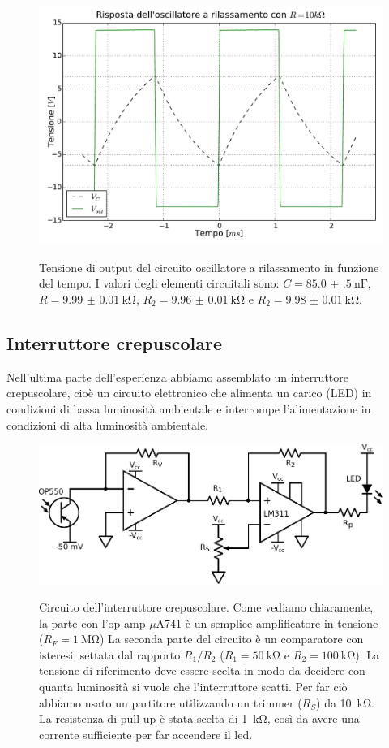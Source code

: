 \begin{figure}[ht]
 \centering
   {\includegraphics[width=14.5cm]{../E04/latex/osc10k.pdf}}
 \caption{Tensione di output del circuito oscillatore a rilassamento in funzione del tempo. I valori degli elementi circuitali sono: $C=\SI{85.0(5)}{\nano\farad}$, $R=\SI{9.99(1)}{\kohm}$, $R_2= \SI{9.96(1)}{\kohm}$ e $R_2=\SI{9.98(1)}{\kohm}$.}
 \label{gr4:osc10k}
\end{figure}

\subsection{Interruttore crepuscolare}

Nell'ultima parte dell'esperienza abbiamo assemblato un interruttore crepuscolare, cioè un circuito elettronico che alimenta un carico (LED) in condizioni di bassa luminosità ambientale e interrompe l'alimentazione in condizioni di alta luminosità ambientale.

\begin{figure}[ht]
 \centering
   {\includegraphics[width=12.5cm]{../E04/latex/c_crepuscolare.pdf}}
 \caption{Circuito dell'interruttore crepuscolare. Come vediamo chiaramente, la parte con l'op-amp $\mu$A741 è un semplice amplificatore in tensione ($R_F = \SI{1}{\Mohm}$) La seconda parte del circuito è un comparatore con isteresi, settata dal rapporto $R_1/R_2$ ($R_1 = \SI{50}{\kohm}$ e $R_2 = \SI{100}{\kohm}$). La tensione di riferimento deve essere scelta in modo da decidere con quanta luminosità si vuole che l'interruttore scatti. Per far ciò abbiamo usato un partitore utilizzando un trimmer ($R_S$) da \SI{10}{\kohm}. La resistenza di pull-up è stata scelta di  \SI{1}{\kohm}, così da avere una corrente sufficiente per far accendere il led.}
 \label{cir4:crepuscolare}
\end{figure}

